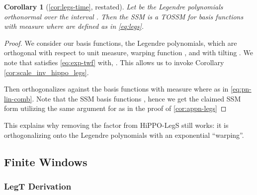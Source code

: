 \documentclass{article}
\newtheorem{corollary}[lemma]{Corollary}
\begin{document}
\begin{corollary}[\cref{cor:legs-time}, restated]
  Let  be the Legendre polynomials orthonormal over the interval . Then the SSM  is a TOSSM for basis functions  with measure  where
    are defined as in \eqref{eq:legs}.
\end{corollary}
 \begin{proof}
We consider our basis functions, the Legendre polynomials, which are orthogonal with respect to unit measure, warping function , and with tilting . We note that  satisfies \eqref{eq:exp-twf} with, . This allows us to invoke Corollary \ref{cor:scale_inv_hippo_legs}.

  Then  orthogonalizes against the basis functions  with measure  where
    as in \ref{eq:pn-lin-comb}. Note that the SSM basis functions , hence we get the claimed SSM form utilizing the same argument for  as in the proof of \cref{cor:appn-legs}
\end{proof}

This explains why removing the  factor from HiPPO-LegS still works: it is orthogonalizing onto the Legendre polynomials with an exponential ``warping''.



\subsection{Finite Windows}
\label{sec:proofs:finite}
\subsubsection{LegT Derivation}
\end{document}
